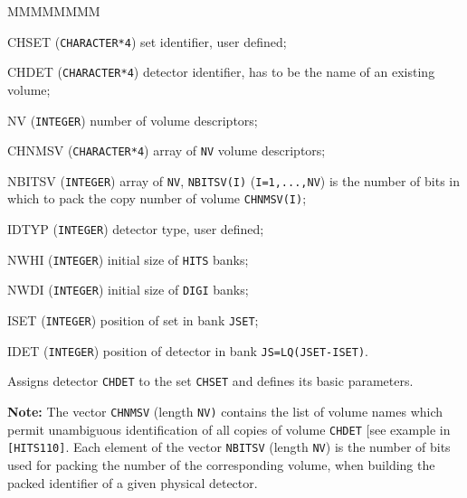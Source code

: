                 
                
 
\begin{DLtt}{MMMMMMMM}
\item[CHSET] ({\tt CHARACTER*4}) set identifier, user defined;
\item[CHDET] ({\tt CHARACTER*4}) detector identifier,
has to be the name of an existing volume;
\item[NV] ({\tt INTEGER}) number of volume descriptors;
\item[CHNMSV] ({\tt CHARACTER*4}) array of {\tt NV} volume descriptors;
\item[NBITSV] ({\tt INTEGER}) array of {\tt NV}, {\tt NBITSV(I)} 
({\tt I=1,...,NV}) is the number of bits in which to pack the copy 
number of volume {\tt CHNMSV(I)};
\item[IDTYP] ({\tt INTEGER}) detector type, user defined;
\item[NWHI] ({\tt INTEGER}) initial size of {\tt HITS} banks;
\item[NWDI] ({\tt INTEGER}) initial size of {\tt DIGI} banks;
\item[ISET] ({\tt INTEGER}) position of set in bank {\tt JSET};
\item[IDET] ({\tt INTEGER}) position of detector in bank {\tt JS=LQ(JSET-ISET)}.
\end{DLtt}

Assigns detector {\tt CHDET} to the set {\tt CHSET}
and defines its basic parameters.
 
{\bf Note:} The vector {\tt CHNMSV} (length {\tt NV)} contains the list of
volume names which permit unambiguous identification of all copies of
volume {\tt CHDET} [see example in {\tt [HITS110]}.
Each element of the vector {\tt NBITSV} (length {\tt NV}) is the number
of bits used for packing the number of the corresponding volume, when building
the packed identifier of a given physical detector.

